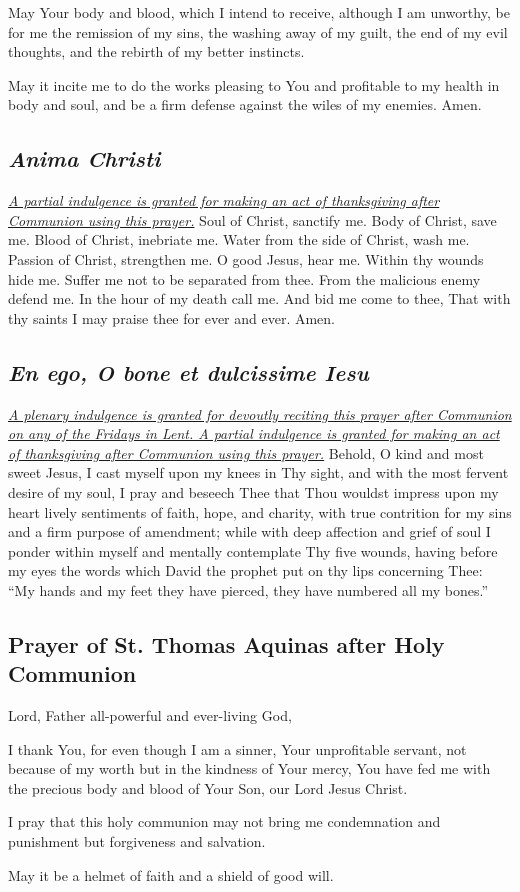 \documentclass[12pt]{article}
\newcommand{\prayertitle}[1]{\subsection{#1}}
\newcommand{\indulgencedprayertitle}[1]{\prayertitle{#1 \protect\kreuz}}
\newcommand{\foreign}[1]{\textsl{#1}}
\newcommand{\note}[1]{{\small{\textsl{#1}}}\newline}
\newcommand{\linkednote}[2]{\hyperlink{#1}{\note{#2}}}
\begin{document}
May Your body and blood, which I intend to receive, although I am unworthy, be for me the remission of my sins, the washing away of my guilt, the end of my evil thoughts, and the rebirth of my better instincts.

May it incite me to do the works pleasing to You and profitable to my health in body and soul, and be a firm defense against the wiles of my enemies.
Amen.
\newpage
\indulgencedprayertitle{\foreign{Anima Christi}}
\linkednote{grant8}{A partial indulgence is granted for making an act of thanksgiving after Communion using this prayer.}
Soul of Christ, sanctify me.
Body of Christ, save me.
Blood of Christ, inebriate me.
Water from the side of Christ, wash me.
Passion of Christ, strengthen me.
O good Jesus, hear me.
Within thy wounds hide me.
Suffer me not to be separated from thee.
From the malicious enemy defend me.
In the hour of my death call me.
And bid me come to thee,
That with thy saints I may praise thee for ever and ever.
Amen.

\indulgencedprayertitle{\foreign{En ego, O bone et dulcissime Iesu}}
\linkednote{grant8}{A plenary indulgence is granted for devoutly reciting this prayer after Communion on any of the Fridays in Lent. A partial indulgence is granted for making an act of thanksgiving after Communion using this prayer.}
Behold, O kind and most sweet Jesus, I cast myself upon my knees in Thy sight, and with the most fervent desire of my soul, I pray and beseech Thee that Thou wouldst impress upon my heart lively sentiments of faith, hope, and charity, with true contrition for my sins and a firm purpose of amendment;
while with deep affection and grief of soul I ponder within myself and mentally contemplate Thy five wounds, having before my eyes the words which David the prophet put on thy lips concerning Thee:
``My hands and my feet they have pierced, they have numbered all my bones.''

\prayertitle{Prayer of St. Thomas Aquinas after Holy Communion}
Lord, Father all-powerful and ever-living God,

I thank You, for even though I am a sinner, Your unprofitable servant, not because of my worth but in the kindness of Your mercy, You have fed me with the precious body and blood of Your Son, our Lord Jesus Christ.

I pray that this holy communion may not bring me condemnation and punishment but forgiveness and salvation.

May it be a helmet of faith and a shield of good will.
\end{document}

